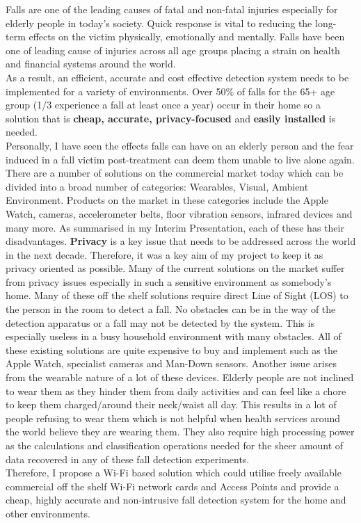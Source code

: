 Falls are one of the leading causes of fatal and non-fatal injuries especially for elderly people in today's society. Quick response is vital to reducing the long-term effects on the victim physically, emotionally and mentally. Falls have been one of leading cause of injuries across all age groups placing a strain on health and financial systems around the world. \\
As a result, an efficient, accurate and cost effective detection system needs to be implemented for a variety of environments. Over 50\% of falls for the 65+ age group (1/3 experience a fall at least once a year) occur in their home so a solution that is \textbf{cheap, accurate, privacy-focused} and \textbf{easily installed} is needed. \\
Personally, I have seen the effects falls can have on an elderly person and the fear induced in a fall victim post-treatment can deem them unable to live alone again. \\
There are a number of solutions on the commercial market today which can be divided into a broad number of categories: Wearables, Visual, Ambient Environment. Products on the market in these categories include the Apple Watch, cameras, accelerometer belts, floor vibration sensors, infrared devices and many more. As summarised in my Interim Presentation, each of these has their disadvantages. \textbf{Privacy} is a key issue that needs to be addressed across the world in the next decade. Therefore, it was a key aim of my project to keep it as privacy oriented as possible. Many of the current solutions on the market suffer from privacy issues especially in such a sensitive environment as somebody's home. Many of these off the shelf solutions require direct Line of Sight (LOS) to the person in the room to detect a fall. No obstacles can be in the way of the detection apparatus or a fall may not be detected by the system. This is especially useless in a busy household environment with many obstacles. All of these existing solutions are quite expensive to buy and implement such as the Apple Watch, specialist cameras and Man-Down sensors. Another issue arises from the wearable nature of a lot of these devices. Elderly people are not inclined to wear them as they hinder them from daily activities and can feel like a chore to keep them charged/around their neck/waist all day. This results in a lot of people refusing to wear them which is not helpful when health services around the world believe they are wearing them. They also require high processing power as the calculations and classification operations needed for the sheer amount of data recovered in any of these fall detection experiments. \\
Therefore, I propose a Wi-Fi based solution which could utilise freely available commercial off the shelf Wi-Fi network cards and Access Points and provide a cheap, highly accurate and non-intrusive fall detection system for the home and other environments. 